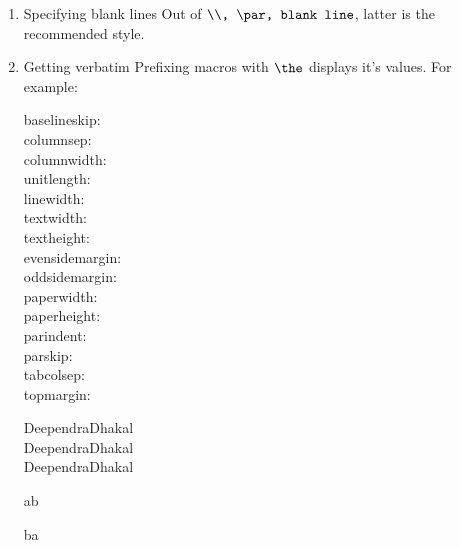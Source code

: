 \documentclass{article}
\begin{document}
\begin{enumerate}
\item Specifying blank lines
Out of $\verb|\\, \par, blank line|$, latter is the recommended style.

\item Getting verbatim
\noindent Prefixing macros with $\verb|\the|$ displays it's values. For example:

  \noindent baselineskip: \the\baselineskip \\
  columnsep: \the\columnsep \\
  columnwidth: \the\columnwidth \\
  unitlength: \the\unitlength \\
  linewidth: \the\linewidth \\
  textwidth: \the\textwidth \\
  textheight: \the\textheight \\
  evensidemargin: \the\evensidemargin \\
  oddsidemargin: \the\oddsidemargin \\
  paperwidth: \the\paperwidth \\
  paperheight: \the\paperheight \\
  parindent: \the\parindent \\
  parskip: \the\parskip \\
  tabcolsep: \the\tabcolsep \\
  topmargin: \the\topmargin
 
   \noindent Deependra\hrulefill Dhakal \\
   \null \noindent Deependra\dotfill Dhakal \\
   \noindent Deependra\hrulefill Dhakal\null \\
   \noindent{}
 
 a\hfill b\vfill
 
 b\hfill a

\end{enumerate}
\end{document}

